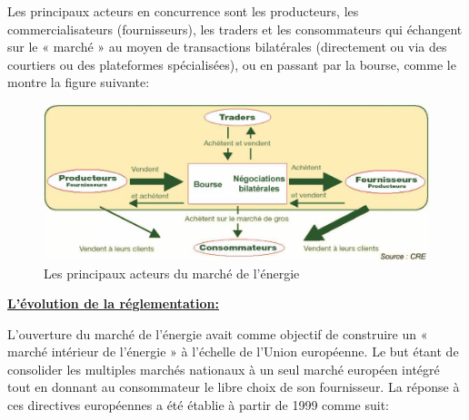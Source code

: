 \documentclass[12pt]{article}
\begin{document}
{Les principaux acteurs en concurrence sont les producteurs, les commercialisateurs (fournisseurs), les traders et les consommateurs qui échangent sur le « marché » au moyen de transactions bilatérales (directement ou via des courtiers ou des plateformes spécialisées), ou en passant par la bourse, comme le montre la figure suivante:



\begin{figure}[H]
	\centering
    \includegraphics[width=1\textwidth]{image1.png}
     \caption{ Les principaux acteurs du  marché de l’énergie }
    \label{fig:1}
\end{figure}


\textbf{\underline{L'\'evolution de la r\'eglementation:}}

L'ouverture du marché de l'énergie avait comme objectif de construire un « marché intérieur de l'énergie » à l'échelle de l'Union européenne. Le but étant de consolider les multiples marchés nationaux à un seul marché européen intégré tout en donnant au consommateur le libre choix de son fournisseur.
La réponse à ces directives européennes a été établie à partir de 1999 comme suit:

\begin{center}
\begin{tabular}{|p{2cm}|p{13cm}|}
\hline
 

\end{tabular}
\end{center}}
\end{document}
